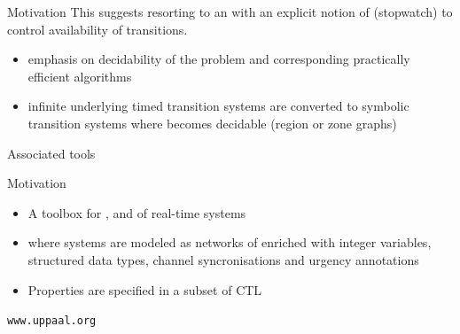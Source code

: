 \documentclass[aspectratio=169]{beamer}
\begin{document}
\begin{slide}{Motivation}
\small
This suggests resorting to an  with an explicit notion of 
 (stopwatch) to control availability of transitions.


\begin{center}
\end{center}


\begin{itemize}
\item emphasis on decidability of the  problem and corresponding practically efficient algorithms
\item infinite underlying  timed transition systems are converted to  symbolic transition systems where  becomes decidable (\alert{region} or \alert{zone} graphs)
\end{itemize}

\noindent
\alert{Associated tools}
\end{slide}

\begin{slide}{Motivation}
\small



\begin{center}
\end{center}

\begin{itemize}
\item  A toolbox for ,  and  of real-time systems
\item where systems are modeled as networks of  enriched with \alert{integer variables},
\alert{structured data types},
\alert{channel syncronisations} and
\alert{urgency annotations}
\item  Properties are specified in a subset of CTL 
\end{itemize}


\begin{flushright}
\texttt{www.uppaal.org}
\end{flushright}
\end{slide}
\end{document}
